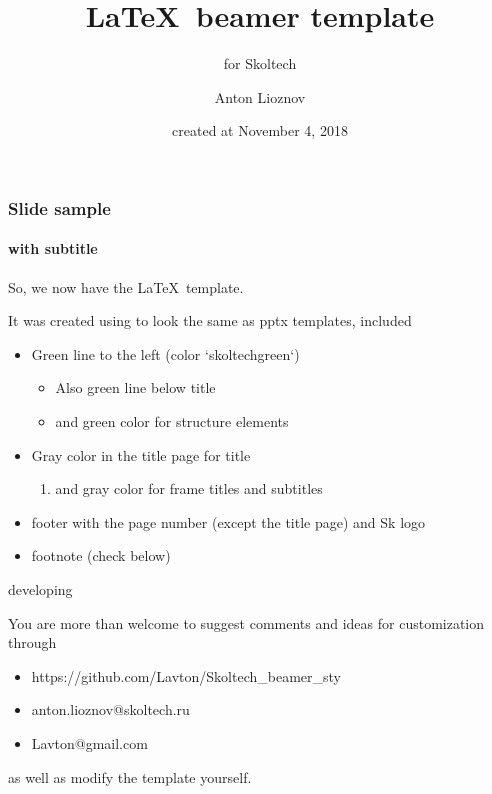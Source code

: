 \documentclass{beamer}
\begin{document}
\title{\LaTeX ~beamer template}
\subtitle{for Skoltech}
\author{Anton Lioznov}
\date{created at November 4, 2018}
\frame{\titlepage}

\begin{frame}\frametitle{Slide sample}\framesubtitle{with subtitle}
So, we now have the \LaTeX ~template.

It was created using to look the same as pptx templates,
included
\begin{itemize}
    \item Green line to the left (color `skoltechgreen`)
    \begin{itemize}
        \item Also green line below title
        \item and green color for structure elements
    \end{itemize}
    \item Gray color in the title page for title
    \begin{enumerate}
        \item and gray color for frame titles and subtitles 
    \end{enumerate}
    \item footer with the page number (except the title page) and Sk logo
    \item footnote (check below)
\end{itemize}

\end{frame}

\begin{frame}{developing}

You are more than welcome to suggest comments and ideas for customization through
\begin{itemize}
    \item https://github.com/Lavton/Skoltech\_beamer\_sty
    \item anton.lioznov@skoltech.ru
    \item Lavton@gmail.com
\end{itemize}
as well as modify the template yourself.

\end{frame}
\end{document}
